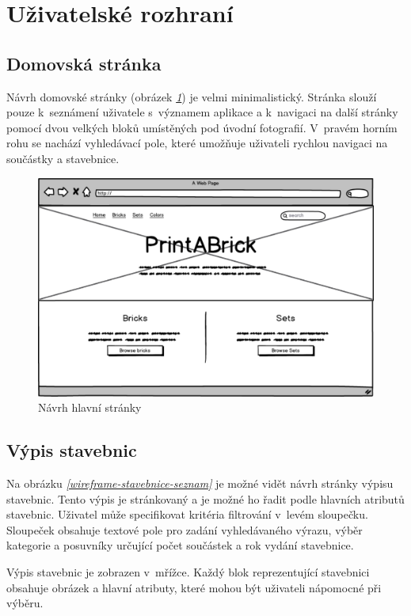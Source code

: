 \section{Uživatelské rozhraní}

\subsection{Domovská stránka}
Návrh domovské stránky (obrázek \emph{\ref{wireframe-hlavni}}) je velmi minimalistický. Stránka slouží pouze k~seznámení uživatele s~významem aplikace a k~navigaci na další stránky pomocí dvou velkých bloků umístěných pod úvodní fotografií. V~pravém horním rohu se nachází vyhledávací pole, které umožňuje uživateli rychlou navigaci na součástky a stavebnice.

\begin{figure}[htbp]
    \centering
    \includegraphics[width=\textwidth,height=\textheight,keepaspectratio]{pdfs/wireframe_home.pdf}
    \caption{Návrh hlavní stránky}\label{wireframe-hlavni}
\end{figure}


\subsection{Výpis stavebnic}
Na obrázku \emph{\ref{wireframe-stavebnice-seznam}} je možné vidět návrh stránky výpisu stavebnic. Tento výpis je stránkovaný a je možné ho řadit podle hlavních atributů stavebnic. Uživatel může specifikovat kritéria filtrování v~levém sloupečku. Sloupeček obsahuje textové pole pro zadání vyhledávaného výrazu, výběr kategorie a posuvníky určující počet součástek a rok vydání stavebnice.

Výpis stavebnic je zobrazen v~mřížce. Každý blok reprezentující stavebnici obsahuje obrázek a hlavní atributy, které mohou být uživateli nápomocné při výběru.

